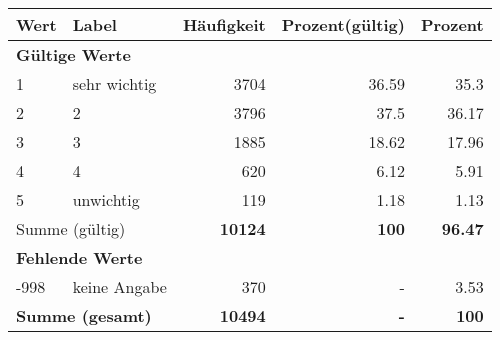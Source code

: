      \begin{longtable}{lXrrr}
     \toprule
     \textbf{Wert} & \textbf{Label} & \textbf{Häufigkeit} & \textbf{Prozent(gültig)} & \textbf{Prozent} \\
     \endhead
     \midrule
     \multicolumn{5}{l}{\textbf{Gültige Werte}}\\

     1 &
     \multicolumn{1}{X}{ sehr wichtig   } &


       \num{3704} &
       \num[round-mode=places,round-precision=2]{36.59} &
         \num[round-mode=places,round-precision=2]{35.3} \\

     2 &
     \multicolumn{1}{X}{ 2   } &


       \num{3796} &
       \num[round-mode=places,round-precision=2]{37.5} &
         \num[round-mode=places,round-precision=2]{36.17} \\

     3 &
     \multicolumn{1}{X}{ 3   } &


       \num{1885} &
       \num[round-mode=places,round-precision=2]{18.62} &
         \num[round-mode=places,round-precision=2]{17.96} \\

     4 &
     \multicolumn{1}{X}{ 4   } &


       \num{620} &
       \num[round-mode=places,round-precision=2]{6.12} &
         \num[round-mode=places,round-precision=2]{5.91} \\

     5 &
     \multicolumn{1}{X}{ unwichtig   } &


       \num{119} &
       \num[round-mode=places,round-precision=2]{1.18} &
         \num[round-mode=places,round-precision=2]{1.13} \\
     \midrule
     \multicolumn{2}{l}{Summe (gültig)} &
       \textbf{\num{10124}} &
     \textbf{\num{100}} &
       \textbf{\num[round-mode=places,round-precision=2]{96.47}} \\
     \multicolumn{5}{l}{\textbf{Fehlende Werte}}\\
       -998 &
       keine Angabe &
         \num{370} &
        - &
         \num[round-mode=places,round-precision=2]{3.53} \\
     \midrule
     \multicolumn{2}{l}{\textbf{Summe (gesamt)}} &
          \textbf{\num{10494}} &
        \textbf{-} &
        \textbf{\num{100}} \\
     \bottomrule
     \end{longtable}
     
